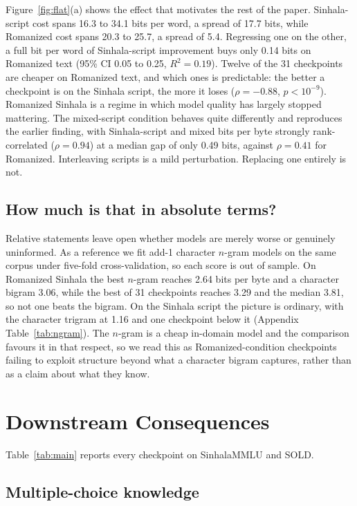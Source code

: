 \documentclass[11pt]{article}
\begin{document}
Figure~\ref{fig:flat}(a) shows the effect that motivates the rest of the paper.
Sinhala-script cost spans 16.3 to 34.1 bits per word, a spread of 17.7 bits, while
Romanized cost spans 20.3 to 25.7, a spread of 5.4. Regressing one on the other, a
full bit per word of Sinhala-script improvement buys only 0.14 bits on Romanized text
(95\% CI 0.05 to 0.25, $R^2 = 0.19$). Twelve of the 31 checkpoints are cheaper on
Romanized text, and which ones is predictable: the better a checkpoint is on the
Sinhala script, the more it loses ($\rho = -0.88$, $p < 10^{-9}$). Romanized Sinhala
is a regime in which model quality has largely stopped mattering. The mixed-script
condition behaves quite differently and reproduces the earlier finding, with
Sinhala-script and mixed bits per byte strongly rank-correlated ($\rho = 0.94$) at a
median gap of only 0.49 bits, against $\rho = 0.41$ for Romanized. Interleaving
scripts is a mild perturbation. Replacing one entirely is not.

\subsection{How much is that in absolute terms?}

Relative statements leave open whether models are merely worse or genuinely
uninformed. As a reference we fit add-1 character $n$-gram models on the same corpus
under five-fold cross-validation, so each score is out of sample. On Romanized
Sinhala the best $n$-gram reaches 2.64 bits per byte and a character bigram 3.06,
while the best of 31 checkpoints reaches 3.29 and the median 3.81, so not one beats
the bigram. On the Sinhala script the picture is ordinary, with the character trigram
at 1.16 and one checkpoint below it (Appendix Table~\ref{tab:ngram}). The $n$-gram is
a cheap in-domain model and the comparison favours it in that respect, so we read
this as Romanized-condition checkpoints failing to exploit structure beyond what a
character bigram captures, rather than as a claim about what they know.


\section{Downstream Consequences}
\label{sec:extrinsic}

Table~\ref{tab:main} reports every checkpoint on SinhalaMMLU and SOLD.

\subsection{Multiple-choice knowledge}
\end{document}
